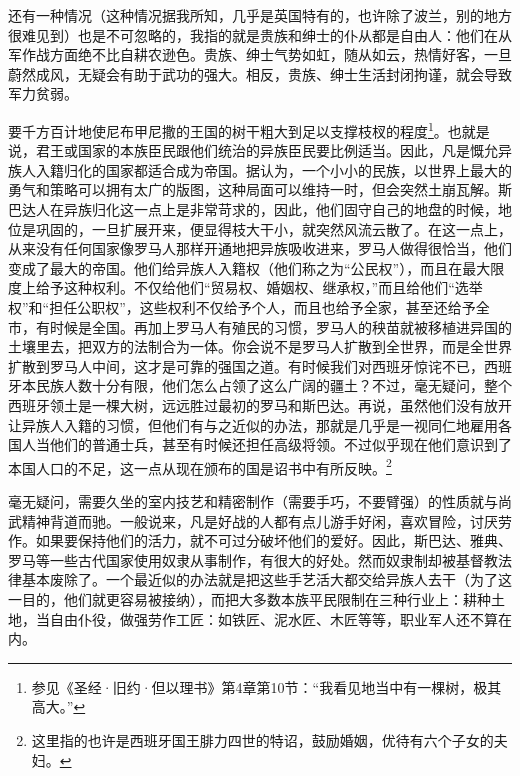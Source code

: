 \par 还有一种情况（这种情况据我所知，几乎是英国特有的，也许除了波兰，别的地方很难见到）也是不可忽略的，我指的就是贵族和绅士的仆从都是自由人：他们在从军作战方面绝不比自耕农逊色。贵族、绅士气势如虹，随从如云，热情好客，一旦蔚然成风，无疑会有助于武功的强大。相反，贵族、绅士生活封闭拘谨，就会导致军力贫弱。
\par 要千方百计地使尼布甲尼撒的王国的树干粗大到足以支撑枝杈的程度\footnote{参见《圣经·旧约·但以理书》第4章第10节：“我看见地当中有一棵树，极其高大。”}。也就是说，君王或国家的本族臣民跟他们统治的异族臣民要比例适当。因此，凡是慨允异族人入籍归化的国家都适合成为帝国。据认为，一个小小的民族，以世界上最大的勇气和策略可以拥有太广的版图，这种局面可以维持一时，但会突然土崩瓦解。斯巴达人在异族归化这一点上是非常苛求的，因此，他们固守自己的地盘的时候，地位是巩固的，一旦扩展开来，便显得枝大干小，就突然风流云散了。在这一点上，从来没有任何国家像罗马人那样开通地把异族吸收进来，罗马人做得很恰当，他们变成了最大的帝国。他们给异族人入籍权（他们称之为“公民权”），而且在最大限度上给予这种权利。不仅给他们“贸易权、婚姻权、继承权，”而且给他们“选举权”和“担任公职权”，这些权利不仅给予个人，而且也给予全家，甚至还给予全市，有时候是全国。再加上罗马人有殖民的习惯，罗马人的秧苗就被移植进异国的土壤里去，把双方的法制合为一体。你会说不是罗马人扩散到全世界，而是全世界扩散到罗马人中间，这才是可靠的强国之道。有时候我们对西班牙惊诧不已，西班牙本民族人数十分有限，他们怎么占领了这么广阔的疆土？不过，毫无疑问，整个西班牙领土是一棵大树，远远胜过最初的罗马和斯巴达。再说，虽然他们没有放开让异族人入籍的习惯，但他们有与之近似的办法，那就是几乎是一视同仁地雇用各国人当他们的普通士兵，甚至有时候还担任高级将领。不过似乎现在他们意识到了本国人口的不足，这一点从现在颁布的国是诏书中有所反映。\footnote{这里指的也许是西班牙国王腓力四世的特诏，鼓励婚姻，优待有六个子女的夫妇。}
\par 毫无疑问，需要久坐的室内技艺和精密制作（需要手巧，不要臂强）的性质就与尚武精神背道而驰。一般说来，凡是好战的人都有点儿游手好闲，喜欢冒险，讨厌劳作。如果要保持他们的活力，就不可过分破坏他们的爱好。因此，斯巴达、雅典、罗马等一些古代国家使用奴隶从事制作，有很大的好处。然而奴隶制却被基督教法律基本废除了。一个最近似的办法就是把这些手艺活大都交给异族人去干（为了这一目的，他们就更容易被接纳），而把大多数本族平民限制在三种行业上：耕种土地，当自由仆役，做强劳作工匠：如铁匠、泥水匠、木匠等等，职业军人还不算在内。

